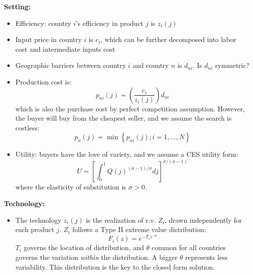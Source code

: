 \documentclass{book}
\theoremstyle{plain}
\theoremstyle{definition}
\newcommand{\red}[1]{{\color{red} #1}}
\newcommand{\blue}[1]{{\color{blue} #1}}
\newcommand{\mytitle}[1]{{\large{\textbf{#1}}}}
\newcommand{\mysubtitle}[1]{{\normalsize{\textbf{#1}}}}
\begin{document}
\mytitle{Setting:}
\begin{itemize}
	\item Efficiency: country $i$'s efficiency in product $j$ is $z_i(j)$
	\item Input price in country $i$ is $c_i$, which can be further decomposed into labor cost and intermediate inputs cost
	\item Geographic barriers between country $i$ and country $n$ is $d_{ni}$. \red{Is $d_{ni}$ symmetric?}
	\item Production cost is:
	\[p _ { n i } ( j ) = \left( \frac { c _ { i } } { z _ { i } ( j ) } \right) d _ { n i }\]
	which is also the purchase cost by perfect competition assumption. However, the buyer will buy from the cheapest seller, and we assume the search is costless:
	\[p _ { n } ( j ) = \min \left\{ p _ { n i } ( j ) ; i = 1 , \ldots , N \right\}\]
	\item Utility: buyers have the love of variety, and we assume a CES utility form:
	\[U = \left[ \int _ { 0 } ^ { 1 } Q ( j ) ^ { ( \sigma - 1 ) / \sigma } d j \right] ^ { \sigma / ( \sigma - 1 ) }\]
	where the elasticity of substitution is $\sigma>0$.
\end{itemize}

\mysubtitle{Technology:}
\begin{itemize}
	\item The technology $z_i(j)$ is the realization of r.v. $Z_i$, drawn independently for each product $j$. $Z_i$ follows a Type II extreme value distribution:
	\[F _ { i } ( z ) = e ^ { - T _ { i } z ^ { - \theta } }\]
	$T_i$ governs the location of distribution, and $\theta$ common for all countries governs the variation \textit{within} the distribution. A bigger $\theta$ represents less variability.
	\blue{This distribution is the key to the closed form solution.}
\end{itemize}
\end{document}

